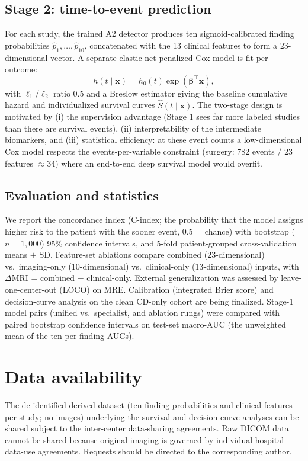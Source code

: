 \documentclass[11pt]{article}
\begin{document}
\subsection*{Stage 2: time-to-event prediction}

For each study, the trained A2 detector produces ten sigmoid-calibrated finding probabilities
$\hat{p}_1,\dots,\hat{p}_{10}$, concatenated with the 13 clinical features to form a 23-dimensional vector.
A separate elastic-net penalized Cox model \cite{polsterl2020scikit} is fit per outcome:
\begin{equation}
    h(t \mid \mathbf{x}) = h_0(t)\exp(\boldsymbol{\beta}^\top \mathbf{x}),
\end{equation}
with $\ell_1/\ell_2$ ratio 0.5 and a Breslow estimator giving the baseline cumulative hazard and
individualized survival curves $\hat{S}(t\mid\mathbf{x})$. The two-stage design is motivated by (i) the
supervision advantage (Stage 1 sees far more labeled studies than there are survival events), (ii)
interpretability of the intermediate biomarkers, and (iii) statistical efficiency: at these event counts a
low-dimensional Cox model respects the events-per-variable constraint (surgery: 782 events / 23 features
$\approx 34$) where an end-to-end deep survival model would overfit.

\subsection*{Evaluation and statistics}

We report the concordance index (C-index; the probability that the model assigns higher risk to the patient
with the sooner event, 0.5 = chance) with bootstrap ($n=1{,}000$) 95\% confidence intervals, and 5-fold
patient-grouped cross-validation means $\pm$ SD. Feature-set ablations compare combined (23-dimensional) vs.\
imaging-only (10-dimensional) vs.\ clinical-only (13-dimensional) inputs, with $\Delta$MRI = combined $-$
clinical-only. External generalization was assessed by leave-one-center-out (LOCO) on MRE. Calibration
(integrated Brier score) and decision-curve analysis \cite{vickers2006dca} on the clean CD-only cohort are
being finalized. Stage-1 model pairs (unified vs.\ specialist, and ablation rungs) were compared with paired
bootstrap confidence intervals on test-set macro-AUC (the unweighted mean of the ten per-finding AUCs).

\section*{Data availability}
The de-identified derived dataset (ten finding probabilities and clinical features per study; no images)
underlying the survival and decision-curve analyses can be shared subject to the inter-center data-sharing
agreements. Raw DICOM data cannot be shared because original imaging is governed by individual hospital
data-use agreements. Requests should be directed to the corresponding author.
\end{document}
